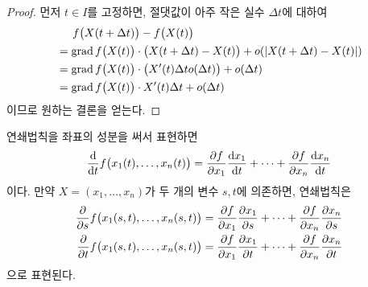 \documentclass[unfonts,oneside,a4paper]{oblivoir}
\theoremstyle{definition}
\theoremstyle{theorem}
\DeclareMathOperator{\grad}{grad}
\begin{document}
\begin{proof}
    먼저 $t \in I$를 고정하면, 절댓값이 아주 작은 실수 $\Delta t$에 대하여
    \begin{align*}
        &\hphantom{=\ \ } f\bigl(X(t + \Delta t)\bigr) - f\bigl(X(t)\bigr)\\
        &= \grad f\bigl(X(t)\bigr) \cdot \bigl(X(t + \Delta t) - X(t)\bigr) + o(|X(t + \Delta t) - X(t)|)\\
        &= \grad f\bigl(X(t)\bigr) \cdot \bigl(X'(t)\Delta t o(\Delta t)\bigr) + o(\Delta t)\\
        &= \grad f\bigl(X(t)\bigr) \cdot X'(t) \Delta t + o(\Delta t)
    \end{align*}
    이므로 원하는 결론을 얻는다.
\end{proof}

연쇄법칙을 좌표의 성분을 써서 표현하면
\begin{equation*}
    \diff*{f\bigl(x_1(t), \dots, x_n(t)\bigr)}{t} = \diffp{f}{x_1} \diff{x_1}{t} + \dots + \diffp{f}{x_n} \diff{x_n}{t}
\end{equation*}
이다. 만약 $X = (x_1, \dots, x_n)$가 두 개의 변수 $s, t$에 의존하면, 연쇄법칙은
\begin{align*}
    \diffp*{f\bigl(x_1(s, t), \dots, x_n(s, t)\bigr)}{s} &= \diffp{f}{x_1} \diffp{x_1}{s} + \dots + \diffp{f}{x_n} \diffp{x_n}{s}\\
    \diffp*{f\bigl(x_1(s, t), \dots, x_n(s, t)\bigr)}{t} &= \diffp{f}{x_1} \diffp{x_1}{t} + \dots + \diffp{f}{x_n} \diffp{x_n}{t}
\end{align*}
으로 표현된다.
\end{document}
